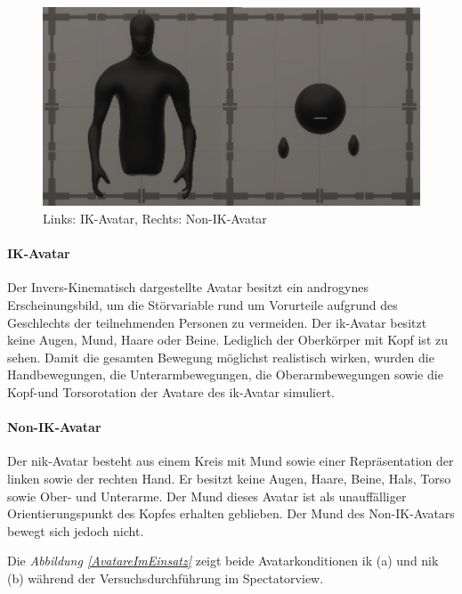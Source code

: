 \documentclass[a4paper,11pt]{article}%
\renewcommand{\\}{\vspace*{0.5\baselineskip} \newline}
\begin{document}
	\begin{figure}[H]
		\begin{footnotesize}
		\centering
			\includegraphics[scale=0.6]{Abbildungen/Avatars.JPG}
			
			\caption[Abbildung 1]{Links: IK-Avatar, Rechts: Non-IK-Avatar}
			\label{AvatareAussehen}
		\end{footnotesize}
	\end{figure}
		\paragraph{IK-Avatar}
Der Invers-Kinematisch dargestellte Avatar besitzt ein androgynes Erscheinungsbild, um die Störvariable rund um Vorurteile aufgrund des Geschlechts der teilnehmenden Personen zu vermeiden. Der \ac{ik}-Avatar besitzt keine Augen, Mund, Haare oder Beine. Lediglich der Oberkörper mit Kopf ist zu sehen.
Damit die gesamten Bewegung möglichst realistisch wirken, wurden die Handbewegungen, die Unterarmbewegungen, die Oberarmbewegungen sowie die Kopf-und Torsorotation der Avatare des \ac{ik}-Avatar simuliert.

		\paragraph{Non-IK-Avatar}
Der \ac{nik}-Avatar besteht aus einem Kreis mit Mund sowie einer Repräsentation der linken sowie der rechten Hand. Er besitzt keine Augen, Haare, Beine, Hals, Torso sowie Ober- und Unterarme. Der Mund dieses Avatar ist als unauffälliger Orientierungspunkt des Kopfes erhalten geblieben. Der Mund des Non-IK-Avatars bewegt sich jedoch nicht. 
\newpage

Die \textit{Abbildung \ref{AvatareImEinsatz}} zeigt beide Avatarkonditionen \ac{ik} (a) und \ac{nik} (b) während der Versuchsdurchführung im Spectatorview.
\end{document}
